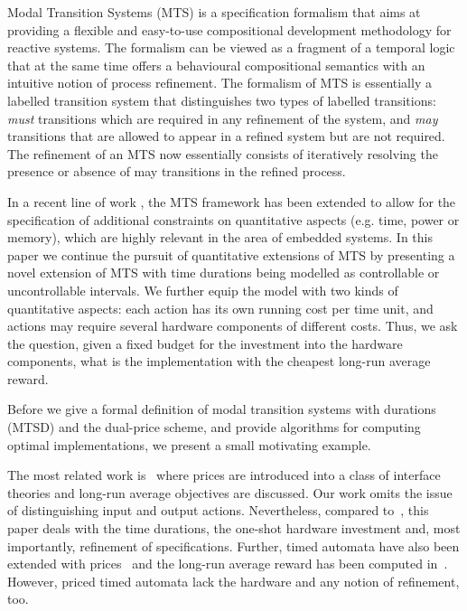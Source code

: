 Modal  Transition  Systems  (MTS) is a specification formalism
\cite{DBLP:conf/lics/LarsenT88,AHLNW:EATCS:08} that aims at providing
a flexible  and   easy-to-use  compositional
development methodology  for reactive systems.  The formalism
can be viewed as  a   fragment  of   a  temporal   
logic~\cite{Aceto:graphical,DBLP:journals/tcs/BoudolL92} that at the same time
offers  a   behavioural compositional semantics with an intuitive
notion of process refinement.
The formalism of MTS is essentially a labelled  transition system
that distinguishes two types of labelled transitions:  
\emph{must}  transitions  which  are required in any  refinement
of the system, and  \emph{may}  transitions  that are allowed
to appear in a refined system but are not required.
The refinement  of an  MTS  now  essentially consists  of
iteratively resolving the presence or absence of may transitions in 
the refined process.

In a recent line of work \cite{JLS:weighted,MFCS11}, the MTS framework
has  been  extended  to  allow  for the  specification  of  additional
constraints on  quantitative aspects  (e.g.  time, power  or memory),
which are  highly relevant in the  area of embedded  systems.  In this
paper we  continue the  pursuit of quantitative  extensions of  MTS by
presenting a novel extension of MTS with time durations being modelled
as  controllable or  uncontrollable  intervals. We  further equip  the
model with two kinds of  quantitative aspects: each action has its own
running cost per  time unit, and actions may  require several hardware
components of  different costs.   Thus, we ask  the question,  given a
fixed budget  for the investment into the hardware components, what  is the implementation
with the cheapest long-run average reward.

\vspace{\smallskipamount}
Before we  give a formal  definition of modal transition  systems with
durations (MTSD) and the dual-price scheme, and provide algorithms for
computing  optimal  implementations,  we  present  a  small  motivating
example.



\vspace{\smallskipamount}

The most related work is~\cite{DBLP:conf/emsoft/ChakrabartiAHS03} where prices are introduced into a class of interface theories and long-run average objectives are discussed. Our work omits the issue of distinguishing input and output actions. Nevertheless, compared to~\cite{DBLP:conf/emsoft/ChakrabartiAHS03}, this paper deals with the time durations, the one-shot hardware investment and, most importantly, refinement of specifications. Further, timed automata have also been extended with prices~\cite{DBLP:conf/fmco/BehrmannLR04} and the long-run average reward has been computed in~\cite{DBLP:journals/fmsd/BouyerBL08}. However, priced timed automata lack the hardware and any notion of refinement, too.

